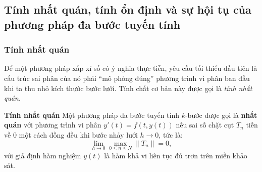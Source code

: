 \subsection{Tính nhất quán, tính ổn định và sự hội tụ của phương pháp đa bước tuyến tính}
 
\subsubsection{Tính nhất quán}

Để một phương pháp xấp xỉ số có ý nghĩa thực tiễn, yêu cầu tối thiểu đầu tiên là cấu trúc sai phân của nó phải ``mô phỏng đúng'' phương trình vi phân ban đầu khi ta thu nhỏ kích thước bước lưới. Tính chất cơ bản này được gọi là \textit{tính nhất quán}.

\vspace{0.5em}
\begin{baitapbox}{\textbf{Tính nhất quán}}
    Một phương pháp đa bước tuyến tính $k$-bước được gọi là \textbf{nhất quán} với phương trình vi phân $y'(t) = f(t, y(t))$ nếu sai số chặt cụt $T_{n}$ tiến về $0$ một cách đồng đều khi bước nhảy lưới $h \to 0$, tức là:
    \begin{equation}
        \lim_{h \to 0} \max_{0 \le n \le N} \|T_{n}\| = 0, \tag{2.10} \label{eq:2.10}
    \end{equation}
    \noindent với giả định hàm nghiệm $y(t)$ là hàm khả vi liên tục đủ trơn trên miền khảo sát.
\end{baitapbox}

